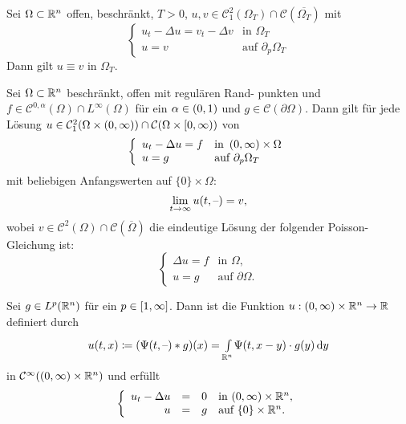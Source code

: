 \documentclass{cheat-sheet}
\begin{document}
\begin{kor}[Eindeutigkeit]
  Sei $\Omega \subset \mathbb{R}^n$ offen, beschränkt, $T > 0$, $u, v \in \mathcal{C}^2_1(\Omega_T) \cap \mathcal{C}(\overline{\Omega_T})$ mit
  \[
    \left\{ \begin{array}{ll}
      u_t - \Delta u = v_t - \Delta v & \text{in } \Omega_T\\
      u = v & \text{auf } \partial_p \Omega_T
    \end{array} \right.
  \]
  Dann gilt $u \equiv v$ in $\Omega_T$.
\end{kor}

\begin{prop}
  Sei $\Omega \subset \mathbb{R}^n$ beschränkt, offen mit regulären Rand- punkten und $f \in \mathcal{C}^{0,\alpha}(\Omega) \cap L^\infty(\Omega)$ für ein $\alpha \in \left( 0, 1 \right)$ und $g \in \mathcal{C}(\partial \Omega)$. Dann gilt für jede Lösung $u \in \mathcal{C}_1^2(\Omega \times \left( 0, \infty \right)) \cap \mathcal{C}(\Omega \times \left[ 0, \infty \right))$ von
  \[
    \left\{ \begin{array}{ll}
      u_t - \Delta u = f & \text{in } \left( 0, \infty \right) \times \Omega\\
      u = g & \text{auf } \partial_p \Omega_T
    \end{array} \right.
  \]
  mit beliebigen Anfangswerten auf $\{ 0 \} \times \Omega$:
  \[
    \lim_{t \to \infty} u(t, \text{--}) = v,
  \]
  wobei $v \in \mathcal{C}^2(\Omega) \cap \mathcal{C}(\overline{\Omega})$ die eindeutige Lösung der folgender Poisson-Gleichung ist:
  \[
    \left\{ \begin{array}{ll}
      \Delta u = f & \text{in } \Omega,\\
      u = g & \text{auf } \partial \Omega.
    \end{array} \right.
  \]
\end{prop}


\begin{satz}
  Sei $g \in L^p(\mathbb{R}^n)$ für ein $p \in \left[ 1, \infty \right]$. Dann ist die Funktion $u : \left( 0, \infty \right) \times \mathbb{R}^n \to \mathbb{R}$ definiert durch
  \[ u(t, x) \coloneqq (\Psi(t, \text{--}) * g)(x) = {\textstyle \int\limits_{\mathbb{R}^n}^{}} \Psi(t, x-y) \cdot g(y) \,\mathrm{d} y \]
  in $\mathcal{C}^\infty(\left( 0, \infty \right) \times \mathbb{R}^n)$ und erfüllt
  \[
    \left\{ \begin{array}{rlll}
      u_t - \Delta u &=& 0 & \text{in $\left( 0, \infty \right) \times \mathbb{R}^n$},\\
      u &=& g & \text{auf $\{ 0 \} \times \mathbb{R}^n$}.
    \end{array} \right.
  \]
\end{satz}
\end{document}
